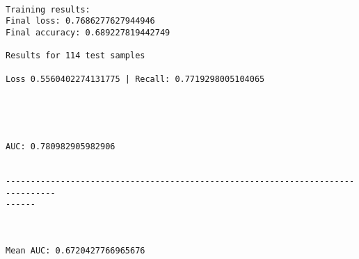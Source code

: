 \documentclass[11pt]{article}
\begin{document}
    \begin{Verbatim}[commandchars=\\\{\}]

Training results:
Final loss: 0.7686277627944946
Final accuracy: 0.689227819442749

Results for 114 test samples

Loss 0.5560402274131775 | Recall: 0.7719298005104065



    \end{Verbatim}

    \begin{center}
    \end{center}
    { \hspace*{\fill} \\}
    
    \begin{Verbatim}[commandchars=\\\{\}]
AUC: 0.780982905982906


--------------------------------------------------------------------------------
------



Mean AUC: 0.6720427766965676

    \end{Verbatim}


    
    
    
\end{document}
